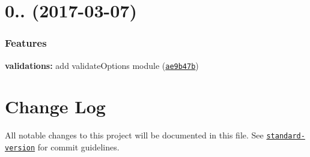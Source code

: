  \section*{0.. (2017-\/03-\/07)}

\subsubsection*{Features}


\begin{DoxyItemize}
\item {\bfseries validations\+:} add validate\+Options module (\href{https://github.com/webpack-contrib/schema-utils/commit/ae9b47b}{\tt ae9b47b})
\end{DoxyItemize}

\section*{Change Log}

All notable changes to this project will be documented in this file. See \href{https://github.com/conventional-changelog/standard-version}{\tt standard-\/version} for commit guidelines. 